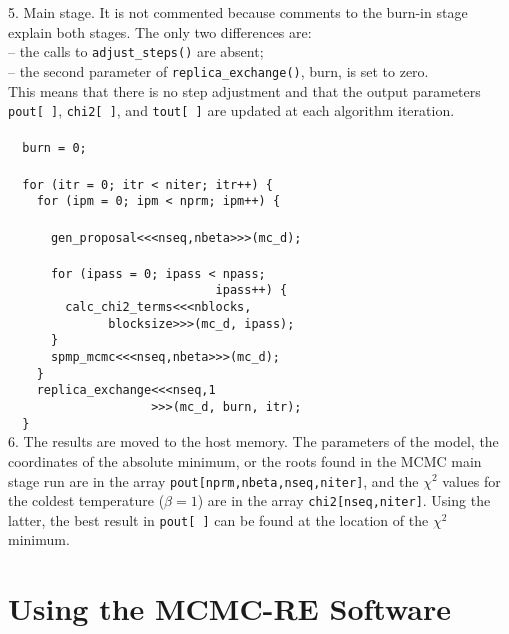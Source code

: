 \documentclass[preprint2]{aastex}
\begin{document}
5. Main stage. It is not commented because comments to the burn-in stage explain both stages. The only two differences are: \\
-- the calls to \verb|adjust_steps()| are absent; \\
-- the second parameter of \verb|replica_exchange()|, burn, is set to zero. \\
This means that there is no step adjustment and that the output parameters 
\verb|pout[ ]|, \verb|chi2[ ]|, and \verb|tout[ ]| are updated at each algorithm iteration. \\ \\
\verb|  burn = 0;| \\\\
\verb|  for (itr = 0; itr < niter; itr++) {| \\
\verb|    for (ipm = 0; ipm < nprm; ipm++) {| \\\\
\verb|      gen_proposal<<<nseq,nbeta>>>(mc_d);| \\\\
\verb|      for (ipass = 0; ipass < npass;| \\
\verb|                             ipass++) {| \\
\verb|        calc_chi2_terms<<<nblocks,| \\
\verb|              blocksize>>>(mc_d, ipass);| \\
\verb|      }| \\
\verb|      spmp_mcmc<<<nseq,nbeta>>>(mc_d);| \\
\verb|    }| \\
\verb|    replica_exchange<<<nseq,1| \\
\verb|                    >>>(mc_d, burn, itr);| \\
\verb|  }| \\

6. The results are moved to the host memory. The parameters of the model, the coordinates of the absolute minimum, or the roots found in the MCMC main stage run are in the array 
\verb|pout[nprm,nbeta,nseq,niter]|, and the $\chi^2$ values for the coldest temperature ($\beta=1$) are in the array \verb|chi2[nseq,niter]|. Using the latter, the best result in \verb|pout[ ]| can be found at the location of the $\chi^2$ minimum.


 
\section{Using the MCMC-RE Software}
\end{document}
